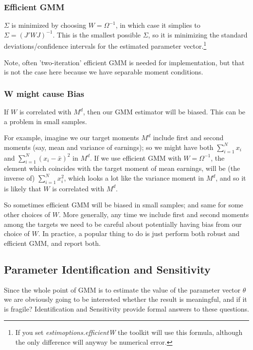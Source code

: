 \subsubsection{Efficient GMM}
$\Sigma$ is minimized by choosing $W=\Omega^{-1}$, in which case it simplies to $\Sigma=(J'W J)^{-1}$. This is the smallest possible $\Sigma$, so it is minimizing the standard deviations/confidence intervals for the estimated parameter vector.\footnote{If you set \textit{estimoptions.efficientW} the toolkit will use this formula, although the only difference will anyway be numerical error.}

Note, often 'two-iteration' efficient GMM is needed for implementation, but that is not the case here because we have separable moment conditions.

\subsubsection{W might cause Bias}
If $W$ is correlated with $M^d$, then our GMM estimator will be biased. This can be a problem in small samples.

For example, imagine we our target moments $M^d$ include first and second moments (say, mean and variance of earnings); so we might have both $\sum_{i=1}^N x_i$ and $\sum_{i=1}^N (x_i-\bar{x})^2$ in $M^d$. If we use efficient GMM with $W=\Omega^{-1}$, the element which coincides with the target moment of mean earnings, will be (the inverse of) $\sum_{i=1}^N x_i^2$, which looks a lot like the variance moment in $M^d$, and so it is likely that $W$ is correlated with $M^d$.

So sometimes efficient GMM will be biased in small samples; and same for some other choices of $W$. More generally, any time we include first and second moments among the targets we need to be careful about potentially having bias from our choice of $W$. In practice, a popular thing to do is just perform both robust and efficient GMM, and report both.

\subsection{Parameter Identification and Sensitivity}
Since the whole point of GMM is to estimate the value of the parameter vector $\theta$ we are obviously going to be interested whether the result is meaningful, and if it is fragile? Identification and Sensitivity provide formal answers to these questions.


